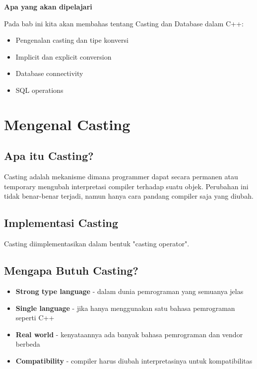 \textbf{Apa yang akan dipelajari}

Pada bab ini kita akan membahas tentang Casting dan Database dalam C++:

\begin{itemize}
\item Pengenalan casting dan tipe konversi
\item Implicit dan explicit conversion
\item Database connectivity
\item SQL operations
\end{itemize}

\minitoc

\section{Mengenal Casting}\label{mengenal-casting}

\subsection{Apa itu Casting?}

Casting adalah mekanisme dimana programmer dapat secara permanen atau temporary mengubah interpretasi compiler terhadap suatu objek. Perubahan ini tidak benar-benar terjadi, namun hanya cara pandang compiler saja yang diubah.

\subsection{Implementasi Casting}

Casting diimplementasikan dalam bentuk "casting operator".

\subsection{Mengapa Butuh Casting?}

\begin{itemize}
\item \textbf{Strong type language} - dalam dunia pemrograman yang semuanya jelas
\item \textbf{Single language} - jika hanya menggunakan satu bahasa pemrograman seperti C++
\item \textbf{Real world} - kenyataannya ada banyak bahasa pemrograman dan vendor berbeda
\item \textbf{Compatibility} - compiler harus diubah interpretasinya untuk kompatibilitas
\end{itemize}

